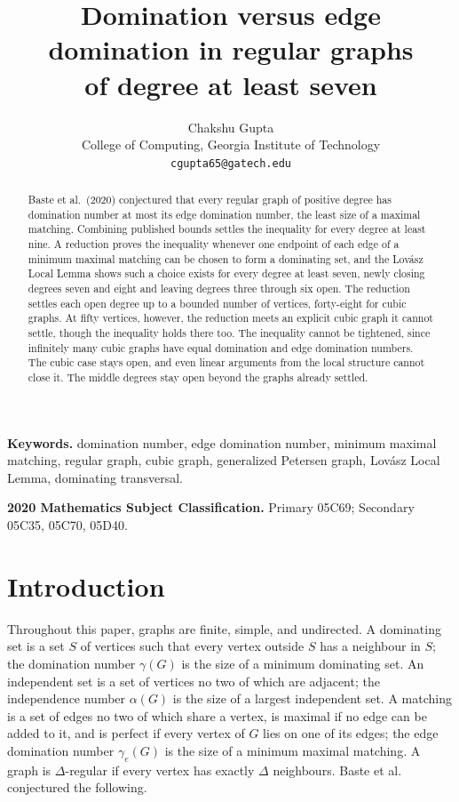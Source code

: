 \documentclass[11pt]{article}
\title{Domination versus edge domination in regular graphs\\ of degree at least seven}
\author{Chakshu Gupta\\[2pt]
  {\small College of Computing, Georgia Institute of Technology}\\
  {\small \texttt{cgupta65@gatech.edu}}}
\date{}
\theoremstyle{definition}
\theoremstyle{remark}
\newcommand{\edom}{\gamma_{e}}
\begin{document}
\maketitle

\begin{abstract}
Baste et al.\ (2020) conjectured that every regular graph of positive degree has
domination number at most its edge domination number, the least size of a
maximal matching. Combining published bounds settles the inequality for every
degree at least nine. A reduction proves the inequality whenever one endpoint of
each edge of a minimum maximal matching can be chosen to form a dominating set,
and the Lov\'asz Local Lemma shows such a choice exists for every degree at least
seven, newly closing degrees seven and eight and leaving degrees three through
six open. The reduction settles
each open degree up to a bounded number of vertices, forty-eight for cubic
graphs. At fifty vertices, however, the reduction meets
an explicit cubic graph it cannot settle, though the inequality holds there too.
The inequality cannot be tightened, since infinitely many cubic graphs have equal
domination and edge domination numbers. The cubic case stays open, and even
linear arguments from the local structure cannot close it. The middle degrees
stay open beyond the graphs already settled.
\end{abstract}

\medskip
\noindent\textbf{Keywords.} domination number, edge domination number, minimum
maximal matching, regular graph, cubic graph, generalized Petersen graph,
Lov\'asz Local Lemma, dominating transversal.

\smallskip
\noindent\textbf{2020 Mathematics Subject Classification.} Primary 05C69;
Secondary 05C35, 05C70, 05D40.

\section{Introduction}\label{sec:intro}

Throughout this paper, graphs are finite, simple, and undirected. A dominating set is a set
$S$ of vertices such that every vertex outside $S$ has a neighbour in $S$; the
domination number $\gamma(G)$ is the size of a minimum dominating set. An
independent set is a set of vertices no two of which are adjacent; the
independence number $\alpha(G)$ is the size of a largest independent set. A matching
is a set of edges no two of which share a vertex, is maximal if no edge can be
added to it, and is perfect if every vertex of $G$ lies on one of its edges; the edge domination number $\edom(G)$ is the size of a minimum
maximal matching. A graph is $\Delta$-regular if every vertex has exactly $\Delta$
neighbours. Baste et al.~\cite{Baste2020} conjectured the following.
\end{document}
